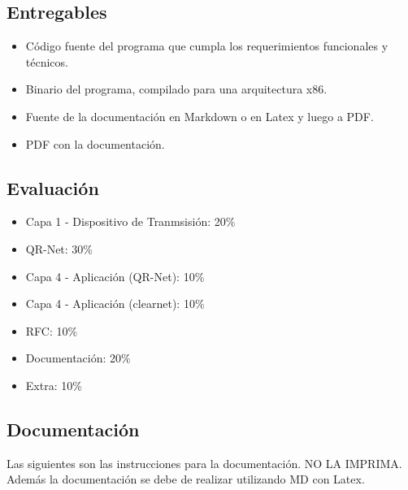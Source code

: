 \documentclass{article}
\providecommand{\tightlist}{%
          \setlength{\itemsep}{0pt}\setlength{\parskip}{0pt}}
\begin{document}
\subsection{Entregables}\label{entregables}

\begin{itemize}
\tightlist
\item
  Código fuente del programa que cumpla los requerimientos funcionales y
  técnicos.
\item
  Binario del programa, compilado para una arquitectura x86.
\item
  Fuente de la documentación en Markdown o en Latex y luego a PDF.
\item
  PDF con la documentación.
\end{itemize}

\subsection{Evaluación}\label{evaluaciuxf3n}

\begin{itemize}
\tightlist
\item
  Capa 1 - Dispositivo de Tranmsisión: 20\%
\item
  QR-Net: 30\%
\item
  Capa 4 - Aplicación (QR-Net): 10\%
\item
  Capa 4 - Aplicación (clearnet): 10\%
\item
  RFC: 10\%
\item
  Documentación: 20\%
\item
  Extra: 10\%
\end{itemize}

\subsection{Documentación}\label{documentaciuxf3n}

Las siguientes son las instrucciones para la documentación. NO LA
IMPRIMA. Además la documentación se debe de realizar utilizando MD con
Latex.
\end{document}
